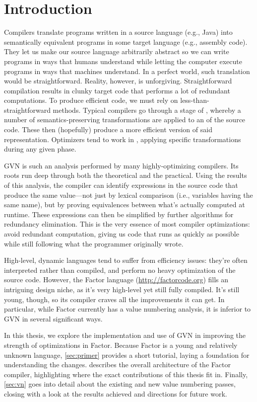 \chapter{Introduction}\label{sec:intro}

Compilers translate programs written in a source language (e.g., Java) into
semantically equivalent programs in some target language (e.g., assembly code).
They let us make our source language arbitrarily abstract so we can write
programs in ways that humans understand while letting the computer execute
programs in ways that machines understand.  In a perfect world, such
translation would be straightforward.  Reality, however, is unforgiving.
Straightforward compilation results in clunky target code that performs a lot
of redundant computations.  To produce efficient code, we must rely on
less-than-straightforward methods.  Typical compilers go through a stage of
, whereby a number of semantics-preserving transformations
are applied to an  of the source code.  These then
(hopefully) produce a more efficient version of said representation.
Optimizers tend to work in , applying specific transformations
during any given phase.

\Gls{GVN} is such an analysis performed by many highly-optimizing compilers.
Its roots run deep through both the theoretical and the practical.  Using the
results of this analysis, the compiler can identify expressions in the source
code that produce the same value---not just by lexical comparison (i.e.,
variables having the same name), but by proving equivalences between what's
actually computed at runtime.  These expressions can then be simplified by
further algorithms for redundancy elimination.  This is the very essence of
most compiler optimizations: avoid redundant computation, giving us code that
runs as quickly as possible while still following what the programmer
originally wrote.

High-level, dynamic languages tend to suffer from efficiency issues: they're
often interpreted rather than compiled, and perform no heavy optimization of
the source code.  However, the Factor language (\url{http://factorcode.org})
fills an intriguing design niche, as it's very high-level yet still fully
compiled.  It's still young, though, so its compiler craves all the
improvements it can get.  In particular, while Factor currently has a
 value numbering analysis, it is inferior to \gls{GVN} in several
significant ways.

In this thesis, we explore the implementation and use of \gls{GVN} in improving
the strength of optimizations in Factor.  Because Factor is a young and
relatively unknown language, \cref{sec:primer} provides a short tutorial,
laying a foundation for understanding the changes.  
describes the overall architecture of the Factor compiler, highlighting where
the exact contributions of this thesis fit in.  Finally, \cref{sec:vn} goes
into detail about the existing and new value numbering passes, closing with a
look at the results achieved and directions for future work. 

